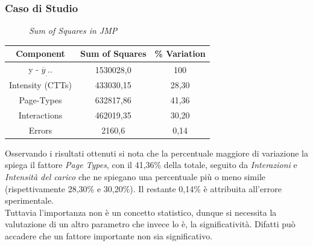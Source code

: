\subsubsection{Caso di Studio}
\begin{figure}[H]
	\caption{\textit{Sum of Squares in JMP}}
\end{figure}
\begin{table}[h]
	\begin{center}
		\begin{tabular}{|c|c|c|}
			\hline
			Component & Sum of Squares & \% Variation\\
			\hline
			 \rule[-4mm]{0mm}{0.5cm}
			 y - {$\overline{y}_...$}   	& 1530028,0		   & 100\\
			 \rule[-4mm]{0mm}{0.5cm}
			 Intensity (CTTs) 		  & 433030,15		   & 28,30\\
			 \rule[-4mm]{0mm}{0.5cm}
			 Page-Types 		  & 632817,86		   & 41,36\\
			 \rule[-4mm]{0mm}{0.5cm}
			 Interactions		  & 462019,35		   & 30,20\\
			 \rule[-4mm]{0mm}{0.5cm}
			 Errors 		  & 2160,6		   & 0,14\\
			\hline
		\end{tabular}
	\end{center}
\end{table}
Osservando i risultati ottenuti si nota che la percentuale maggiore di variazione la spiega il fattore \textit{Page Types}, con il 41,36\% della totale, seguito da \textit{Interazioni} e \textit{Intensità del carico} che ne spiegano una percentuale più o meno simile (rispettivamente 28,30\% e 30,20\%). Il restante 0,14\% è attribuita all'errore sperimentale.
\\
Tuttavia l'importanza non è un concetto statistico, dunque si necessita la valutazione di un altro parametro che invece lo è, la significatività.
Difatti può accadere che un fattore importante non sia significativo.
